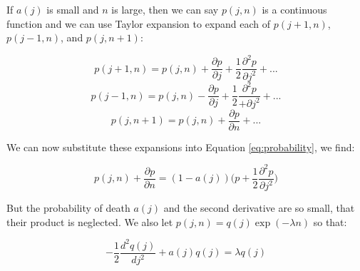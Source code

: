 \documentclass[journal]{IEEEtran}
\begin{document}
If $a(j)$ is small and $n$ is large, then we can say $p(j, n)$ is a continuous
function and we can use Taylor expansion to expand each of $p(j+1, n)$,
$p(j-1,n)$, and $p(j, n+1)$:

\begin{equation}
  p(j+1, n) = p(j,n) + \frac{\partial p}{\partial j} + \frac{1}{2}
  \frac{\partial^2 p}{\partial j^2} + ...
  \nonumber
\end{equation}
\begin{equation}
  p(j-1, n) = p(j,n) - \frac{\partial p}{\partial j} + \frac{1}{2}
  \frac{\partial^2 p}{+\partial j^2} + ...
  \nonumber
\end{equation}
\begin{equation}
  p(j, n+1) = p(j, n) + \frac{\partial p}{\partial n} + ...
  \nonumber
\end{equation}

We can now substitute these expansions into Equation \ref{eq:probability}, we
find:

\begin{equation}
  p(j, n) + \frac{\partial p}{\partial n} = (1-a(j))\Big(p +
  \frac{1}{2}\frac{\partial^2 p}{\partial j^2}\Big)
  \nonumber
\end{equation}

But the probability of death $a(j)$ and the second derivative are so small, that
their product is neglected. We also let $p(j,n) = q(j) \exp(-\lambda n)$ so that:

\begin{equation}
  -\frac{1}{2} \frac{d^2q(j)}{dj^2} + a(j)q(j) = \lambda q(j)
  \nonumber
\end{equation}

\printbibliography
\end{document}
